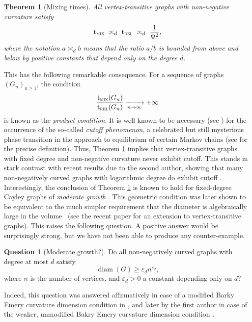 \documentclass[10pt]{amsart}
\newtheorem{theorem}{Theorem}
\theoremstyle{definition}
\newtheorem{question}{Question}
\newcommand{\trel}{\mathrm{t}_{\textup{\textsc{rel}}}}
\newcommand{\tmix}{\mathrm{t}_{\textup{\textsc{mix}}}}
\DeclareMathOperator{\diam}{diam}
\begin{document}
\begin{theorem}[Mixing times]\label{th:graphmix}All vertex-transitive graphs with non-negative curvature satisfy
\begin{equation*}
\tmix \ \asymp_d \ \trel \ \asymp_d \ \frac{1}{\Phi^2},
\end{equation*}
where the notation $a\asymp_d b$ means that the ratio $a/b$ is bounded from above and below by positive constants that depend only on the degree $d$.
\end{theorem}
This has the following remarkable consequence. For a sequence of graphs $(G_n)_{n\ge 1}$, the condition
\begin{equation*}
\frac{\tmix(G_n)}{\trel(G_n)} \xrightarrow[n\to\infty]{} +\infty
\end{equation*}
is known as the \emph{product condition}. It is well-known to be necessary (see \cite[Prop.\,18.4]{MR3726904}) for the occurrence of the so-called \emph{cutoff phenomenon}, a celebrated but still mysterious phase transition in the approach to equilibrium of certain Markov chains (see \cite[Chap.\,18]{MR3726904} for the precise definition). Thus, Theorem \ref{th:graphmix} implies that vertex-transitive graphs with fixed degree and non-negative curvature never exhibit cutoff. This stands in stark contrast with recent results due to the second author, showing that many non-negatively curved graphs with logarithmic degree do exhibit cutoff \cite{salez2021cutoff}. Interestingly, the conclusion of Theorem \ref{th:graphmix} is known to hold for fixed-degree Cayley graphs of \emph{moderate growth} \cite{MR1254308}. This geometric condition was later shown to be equivalent to the much simpler requirement that the diameter is algebraically large in the volume~\cite{MR3439705} (see the recent paper \cite{MR4253426} for an extension to vertex-transitive graphs). This raises the following question. A positive answer would be surprisingly strong, but we have not been able to produce any counter-example.
\begin{question}[Moderate growth?]Do all non-negatively curved graphs with degree at most $d$ satisfy
\begin{equation*}
\diam(G) \ge \varepsilon_d n^{\varepsilon_d},
\end{equation*}
where $n$ is the number of vertices, and $\varepsilon_d>0$ a constant depending only on $d$?
\end{question}

Indeed, this question was answered affirmatively in case of a modified Barky Emery curvature dimension condition in \cite{bauer2015li}, and later by the first author in case of the weaker, unmodified Bakry Emery curvature dimension condition \cite{munch2019li}.
\end{document}
